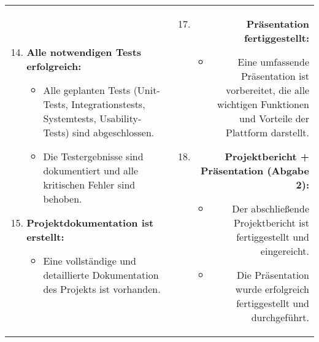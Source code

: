     \vspace{0.5cm}
    \begin{tabularx}{\textwidth}{L R}
        \begin{enumerate}[left=0pt,label=\arabic*.]
            \setcounter{enumi}{13}
            \small %

            \item \textbf{Alle notwendigen Tests erfolgreich:}
            \begin{itemize}[label=--]
                \item Alle geplanten Tests (Unit-Tests, Integrationstests, Systemtests, Usability-Tests) sind abgeschlossen.
                \item Die Testergebnisse sind dokumentiert und alle kritischen Fehler sind behoben.
            \end{itemize}

            \item \textbf{Projektdokumentation ist erstellt:}
            \begin{itemize}[label=--]
                \item Eine vollständige und detaillierte Dokumentation des Projekts ist vorhanden.
            \end{itemize}

        \end{enumerate}
        &
        \begin{enumerate}[left=0pt,label=\arabic*.]
            \setcounter{enumi}{16}
            \small %
            \item \textbf{Präsentation fertiggestellt:}
            \begin{itemize}[label=--]
                \item Eine umfassende Präsentation ist vorbereitet, die alle wichtigen Funktionen und Vorteile der Plattform darstellt.
            \end{itemize}

            \item \textbf{Projektbericht + Präsentation (Abgabe 2):}
            \begin{itemize}[label=--]
                \item Der abschließende Projektbericht ist fertiggestellt und eingereicht.
                \item Die Präsentation wurde erfolgreich fertiggestellt und durchgeführt.
            \end{itemize}
        \end{enumerate}
    \end{tabularx}

